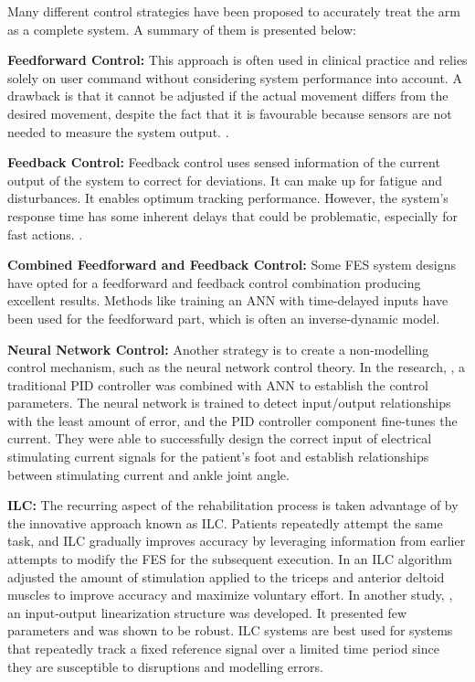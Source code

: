 Many different control strategies have been proposed to accurately treat the arm as a complete system. A summary of them is presented below:

\textbf{Feedforward Control:} This approach is often used in clinical practice and relies solely on user command without considering system performance into account. A drawback is that it cannot be adjusted if the actual movement differs from the desired movement, despite the fact that it is favourable because sensors are not needed to measure the system output.  \cite{CFF}.

\textbf{Feedback Control:} Feedback control uses sensed information of the current output of the system to correct for deviations. It can make up for fatigue and disturbances. It enables optimum tracking performance. However, the system's response time has some inherent delays that could be problematic, especially for fast actions. \cite{CFF}.

\textbf{Combined Feedforward and Feedback Control:} Some FES system designs have opted for a feedforward and feedback control combination producing excellent results. Methods like training an \ac{ANN} with time-delayed inputs have been used for the feedforward part, which is often an inverse-dynamic model.

\textbf{Neural Network Control:} Another strategy is to create a non-modelling control mechanism, such as the neural network control theory. In the research, \cite{NNPID}, a traditional PID controller was combined with \ac{ANN} to establish the control parameters. The neural network is trained to detect input/output relationships with the least amount of error, and the PID controller component fine-tunes the current. They were able to successfully design the correct input of electrical stimulating current signals for the patient's foot and establish relationships between stimulating current and ankle joint angle. 

\textbf{\ac{ILC}:} The recurring aspect of the rehabilitation process is taken advantage of by the innovative approach known as ILC. Patients repeatedly attempt the same task, and ILC gradually improves accuracy by leveraging information from earlier attempts to modify the FES for the subsequent execution. In \cite{FESILC} an ILC algorithm adjusted the amount of stimulation applied to the triceps and anterior deltoid muscles to improve accuracy and maximize voluntary effort. In another study, \cite{IOL}, an input-output linearization structure was developed. It presented few parameters and was shown to be robust.  ILC systems are best used for systems that repeatedly track a fixed reference signal over a limited time period since they are susceptible to disruptions and modelling errors.

